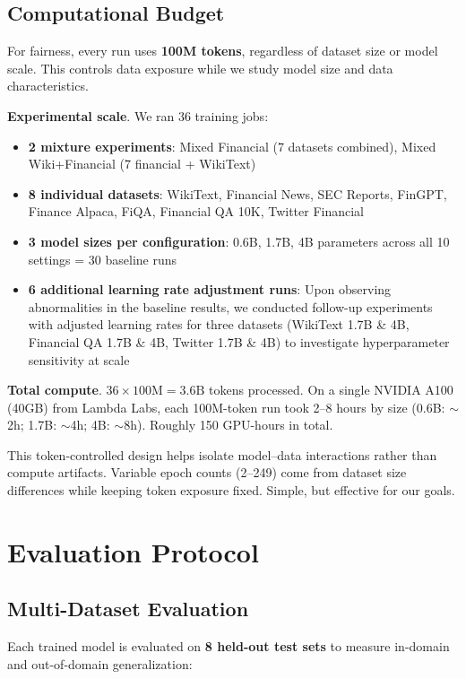 \subsection{Computational Budget}

For fairness, every run uses \textbf{100M tokens}, regardless of dataset size or model scale. This controls data exposure while we study model size and data characteristics.

\textbf{Experimental scale}. We ran 36 training jobs:
\begin{itemize}
    \item \textbf{2 mixture experiments}: Mixed Financial (7 datasets combined), Mixed Wiki+Financial (7 financial + WikiText)
    \item \textbf{8 individual datasets}: WikiText, Financial News, SEC Reports, FinGPT, Finance Alpaca, FiQA, Financial QA 10K, Twitter Financial
    \item \textbf{3 model sizes per configuration}: 0.6B, 1.7B, 4B parameters across all 10 settings = 30 baseline runs
    \item \textbf{6 additional learning rate adjustment runs}: Upon observing abnormalities in the baseline results, we conducted follow-up experiments with adjusted learning rates for three datasets (WikiText 1.7B \& 4B, Financial QA 1.7B \& 4B, Twitter 1.7B \& 4B) to investigate hyperparameter sensitivity at scale
\end{itemize}

\textbf{Total compute}. $36 \times 100\text{M} = 3.6\text{B}$ tokens processed. On a single NVIDIA A100 (40GB) from Lambda Labs, each 100M-token run took 2--8 hours by size (0.6B: $\sim$2h; 1.7B: $\sim$4h; 4B: $\sim$8h). Roughly 150 GPU-hours in total.

This token-controlled design helps isolate model--data interactions rather than compute artifacts. Variable epoch counts (2--249) come from dataset size differences while keeping token exposure fixed. Simple, but effective for our goals.

\section{Evaluation Protocol}

\subsection{Multi-Dataset Evaluation}

Each trained model is evaluated on \textbf{8 held-out test sets} to measure in-domain and out-of-domain generalization:

